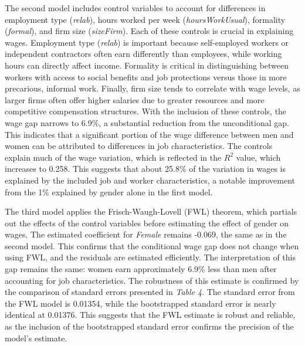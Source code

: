 \documentclass[11pt,a4paper,onecolumn]{article}
\begin{document}
        The second model includes control variables to account for differences in employment type (\textit{relab}), hours worked per week (\textit{hoursWorkUsual}), formality (\textit{formal}), and firm size (\textit{sizeFirm}). Each of these controls is crucial in explaining wages. Employment type (\textit{relab}) is important because self-employed workers or independent contractors often earn differently than employees, while working hours can directly affect income. Formality is critical in distinguishing between workers with access to social benefits and job protections versus those in more precarious, informal work. Finally, firm size tends to correlate with wage levels, as larger firms often offer higher salaries due to greater resources and more competitive compensation structures. With the inclusion of these controls, the wage gap narrows to 6.9\%, a substantial reduction from the unconditional gap. This indicates that a significant portion of the wage difference between men and women can be attributed to differences in job characteristics. The controls explain much of the wage variation, which is reflected in the $R^2$ value, which increases to 0.258. This suggests that about 25.8\% of the variation in wages is explained by the included job and worker characteristics, a notable improvement from the 1\% explained by gender alone in the first model.
        
        The third model applies the Frisch-Waugh-Lovell (FWL) theorem, which partials out the effects of the control variables before estimating the effect of gender on wages. The estimated coefficient for \textit{Female} remains -0.069, the same as in the second model. This confirms that the conditional wage gap does not change when using FWL, and the residuals are estimated efficiently. The interpretation of this gap remains the same: women earn approximately 6.9\% less than men after accounting for job characteristics. The robustness of this estimate is confirmed by the comparison of standard errors presented in \textit{Table 4}. The standard error from the FWL model is 0.01354, while the bootstrapped standard error is nearly identical at 0.01376. This suggests that the FWL estimate is robust and reliable, as the inclusion of the bootstrapped standard error confirms the precision of the model's estimate.
        
\end{document}
